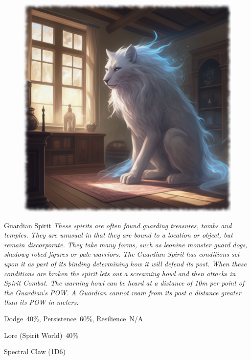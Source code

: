 \begin{figure}[h]
\begin{center}
\includegraphics[scale=0.24]{img/ai-images/guardian-spirit.png}
\end{center}
\end{figure}
\begin{monsterbox}{Guardian Spirit}
	\textit{These spirits are often found guarding treasures, tombs and temples. They are unusual in that they are bound to a location or object, but remain discorporate. They take many forms, such as leonine monster guard dogs, shadowy robed figures or pale warriors. The Guardian Spirit has conditions set upon it as part of its binding determining how it will defend its post. When these conditions are broken the spirit lets out a screaming howl and then attacks in Spirit Combat. The warning howl can be heard at a distance of 10m per point of the Guardian’s POW. A Guardian cannot roam from its post a distance greater than its POW in meters.}\\
	\rpghline
	\basics[%
	powerpoints = 17,
	movementrate = 30m,
	plunderrating = (depends on the Treasure being guarded)
	]
	\rpghline%
	\stats[ %
		STR = -,
		CON = -,
		DEX = -,
		SIZ = -,
		INT = 2D6    (7),
		POW = 3D6+6  (17),
		CHA = 3D6    (11)
	]
	\rpghline%
	\begin{rpg-monsteraction}[Resistances]
		Dodge~40\%, Persistence~60\%, Resilience~N/A
	\end{rpg-monsteraction}
	\begin{rpg-monsteraction}[Knowledge]
		Lore (Spirit World)~40\%
	\end{rpg-monsteraction}
	\begin{rpg-monsteraction}
		Spectral Claw (1D6)
	\end{rpg-monsteraction}
\end{monsterbox}
